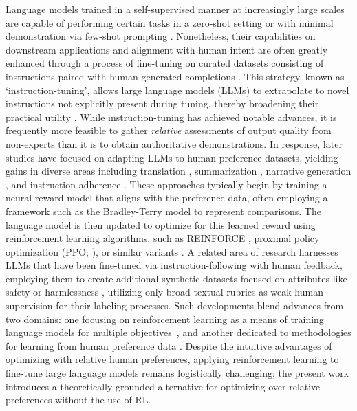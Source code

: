 Language models trained in a self-supervised manner at increasingly large scales are capable of performing certain tasks in a zero-shot setting \citep{radford2019language} or with minimal demonstration via few-shot prompting \citep{gpt3,megatron,chowdhery2022palm}. Nonetheless, their capabilities on downstream applications and alignment with human intent are often greatly enhanced through a process of fine-tuning on curated datasets consisting of instructions paired with human-generated completions \citep{mishra-etal-2022-cross,sanh2022multitask,chung2022scaling,thoppilan2022lamda}. This strategy, known as `instruction-tuning', allows large language models (LLMs) to extrapolate to novel instructions not explicitly present during tuning, thereby broadening their practical utility \citep{chung2022scaling}. While instruction-tuning has achieved notable advances, it is frequently more feasible to gather \textit{relative} assessments of output quality from non-experts than it is to obtain authoritative demonstrations. In response, later studies have focused on adapting LLMs to human preference datasets, yielding gains in diverse areas including translation \citep{kreutzer-etal-2018-reliability}, summarization \citep{stiennon2022learning,ziegler2020finetuning}, narrative generation \citep{ziegler2020finetuning}, and instruction adherence \citep{ouyang2022training,ramamurthy2023is}. These approaches typically begin by training a neural reward model that aligns with the preference data, often employing a framework such as the Bradley-Terry model \citep{bradley1952rankanalysis} to represent comparisons. The language model is then updated to optimize for this learned reward using reinforcement learning algorithms, such as REINFORCE \citep{williams1992reinforce}, proximal policy optimization (PPO; \cite{schulman2017proximal}), or similar variants \citep{ramamurthy2023is}. A related area of research harnesses LLMs that have been fine-tuned via instruction-following with human feedback, employing them to create additional synthetic datasets focused on attributes like safety or harmlessness \citep{bai2022constitutional}, utilizing only broad textual rubrics as weak human supervision for their labeling processes. Such developments blend advances from two domains: one focusing on reinforcement learning as a means of training language models for multiple objectives~\citep{Ranzato2015SequenceLT,paulus2018a,wu2018learning}, and another dedicated to methodologies for learning from human preference data \citep{christiano2017deep,kupcsik2018learning}. Despite the intuitive advantages of optimizing with relative human preferences, applying reinforcement learning to fine-tune large language models remains logistically challenging; the present work introduces a theoretically-grounded alternative for optimizing over relative preferences without the use of RL.

